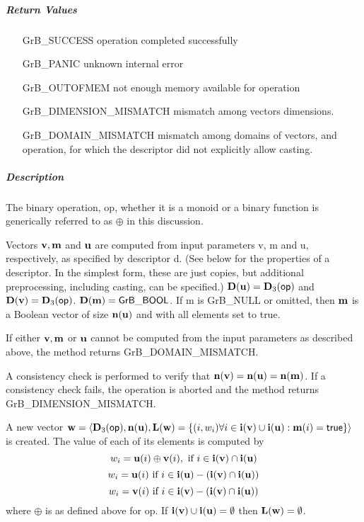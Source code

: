 \subparagraph{Return Values}

\begin{itemize}[leftmargin=2.1in]
\item[{\sf GrB\_SUCCESS}]             operation completed successfully
\item[{\sf GrB\_PANIC}]               unknown internal error
\item[{\sf GrB\_OUTOFMEM}]            not enough memory available for operation
\item[{\sf GrB\_DIMENSION\_MISMATCH}] mismatch among vectors dimensions.
\item[{\sf GrB\_DOMAIN\_MISMATCH}]    mismatch among domains of vectors, and operation, for which the descriptor did not explicitly allow casting.
\end{itemize}

\subparagraph{Description}


The binary operation, {\sf op}, whether it is a monoid or a binary function
is generically referred to as $\oplus$ in this discussion.

Vectors ${\bf v}, {\bf m}$ and ${\bf u}$ are computed from
input parameters {\sf v}, {\sf m} and {\sf u}, respectively, as specified
by descriptor {\sf d}. (See below for the properties of a descriptor. In
the simplest form, these are just copies, but additional preprocessing,
including casting, can be specified.)  $\bold{D}({\bf u}) =
\bold{D}_3({\sf op})$ and $\bold{D}({\bf v}) = \bold{D}_3({\sf op})$.
$\bold{D}({\bf m}) = {\sf GrB\_BOOL}$.  If {\sf m} is {\sf GrB\_NULL} or omitted,
then ${\bf m}$ is a Boolean vector of size $\bold{n}({\bf u})$
and with all elements set to {\sf true}.

If either ${\bf v}, {\bf m}$ or ${\bf u}$ cannot be computed
from the input parameters as described above, the method returns {\sf
GrB\_DOMAIN\_MISMATCH}.

A consistency check is performed to verify that $\bold{n}({\bf v})
= \bold{n}({\bf u}) = \bold{n}({\bf m})$. If a consistency check fails, the operation is
aborted and the method returns {\sf GrB\_DIMENSION\_MISMATCH}.

A new vector ${\bf w} = \langle \bold{D}_3({\sf op}),
\bold{n}({\bf u}), \bold{L}({\bf w}) = \{(i,w_i)  \forall i \in
{\bf i}({\bf v}) \cup {\bf i}({\bf u}) : {\bf m}(i)
= {\sf true} \} \rangle$ is created.  The value of each of its
elements is computed by 
\[
w_i = {\bf u}(i) \oplus {\bf v}(i), \ \mbox{if}\  i \in  {\bf i}({\bf v}) \cap {\bf i}({\bf u})
\]
\[
w_i = {\bf u}(i) \ \mbox{if}\  i \in  {\bf i}({\bf u}) - ({\bf i}({\bf v}) \cap {\bf i}({\bf u}))
\]
\[
w_i = {\bf v}(i) \ \mbox{if}\  i \in  {\bf i}({\bf v}) - ({\bf i}({\bf v}) \cap {\bf i}({\bf u}))
\]
where $\oplus$ is as defined above for {\sf op}.
If ${\bf i}({\bf v}) \cup {\bf i}({\bf u}) = \emptyset$
then $\bold{L}({\bf w}) = \emptyset$.


